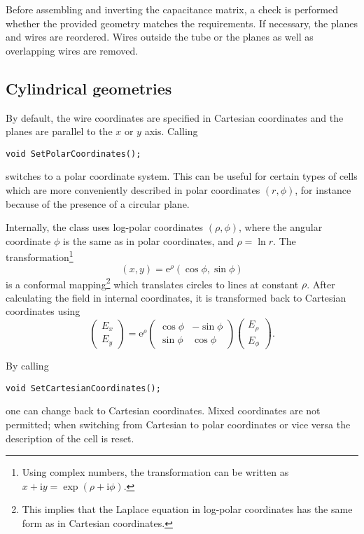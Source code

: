Before assembling and inverting the capacitance matrix, 
a check is performed whether the provided geometry matches the requirements.
If necessary, the planes and wires are reordered. 
Wires outside the tube or the planes as well as overlapping wires are removed.

\subsection{Cylindrical geometries}

By default, the wire coordinates are specified in Cartesian coordinates and 
the planes are parallel to the $x$ or $y$ axis.
Calling 
\begin{lstlisting}
void SetPolarCoordinates();
\end{lstlisting} 
switches to a polar coordinate system. This can be useful for 
certain types of cells which are more conveniently described in polar coordinates
$\left(r, \phi\right)$, for instance because of the presence of a circular plane. 

Internally, the class uses log-polar coordinates $\left(\rho, \phi\right)$, 
where the angular coordinate $\phi$ is the same as in polar coordinates, 
and $\rho = \ln r$. The transformation\footnote{
Using complex numbers, the transformation can be written as 
$x + \text{i}y = \exp\left(\rho + \text{i}\phi\right)$.}
\begin{equation*}
\left(x, y\right) = \text{e}^{\rho}\left(\cos\phi, \sin\phi\right)
\end{equation*}
is a conformal mapping\footnote{This implies that the Laplace equation in log-polar coordinates has the same form as in Cartesian coordinates.} 
which translates circles to lines at constant $\rho$. 
After calculating the field in internal coordinates, it is transformed back to 
Cartesian coordinates using
\begin{equation*}
\begin{pmatrix}E_{x}\\E_{y}\end{pmatrix} = \text{e}^{\rho}
\begin{pmatrix}\cos\phi & -\sin\phi \\ \sin\phi & \cos\phi\end{pmatrix}
\begin{pmatrix}E_{\rho}\\E_{\phi}\end{pmatrix}. 
\end{equation*}

By calling 
\begin{lstlisting}
void SetCartesianCoordinates();
\end{lstlisting} 
one can change back to Cartesian coordinates. 
Mixed coordinates are not permitted; when switching from Cartesian to polar 
coordinates or vice versa the description of the cell is reset.

